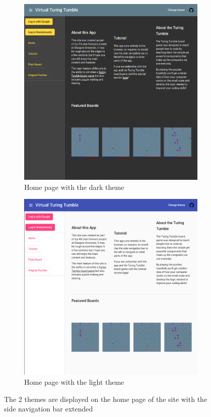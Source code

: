 \documentclass{l4proj}
\begin{document}
\begin{figure}
    \centering
    \begin{subfigure}[b]{0.75\textwidth}
        \includegraphics[width=\textwidth]{images/darkTheme.png}
        \caption{Home page with the dark theme}
        \label{fig:homepageDark}
    \end{subfigure}
    \begin{subfigure}[b]{0.75\textwidth}
        \includegraphics[width=\textwidth]{images/lightTheme.png}
        \caption{Home page with the light theme}
        \label{fig:homepageLight}
    \end{subfigure}
    \caption{The 2 themes are displayed on the home page of the site with the side navigation bar extended}
    \label{fig:themes}
\end{figure}
\end{document}
